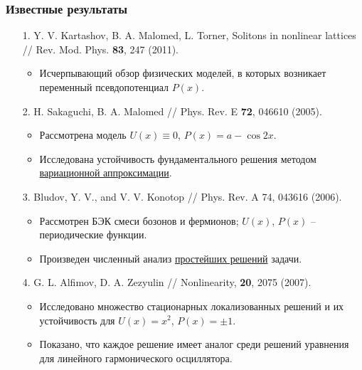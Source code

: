 \documentclass [10pt] {beamer}
\begin{document}
\begin{frame}
	\frametitle{Известные результаты}
	
	\begin{small}
	\begin{enumerate}
		\setlength\itemsep{5pt}
		\item[1.] Y. V. Kartashov, B. A. Malomed, L. Torner, Solitons in nonlinear lattices // Rev. Mod. Phys. {\bf 83}, 247 (2011).
			\begin{itemize}
				\item Исчерпывающий обзор физических моделей, в которых возникает переменный псевдопотенциал $P(x)$.
			\end{itemize}
		\item[2.] H. Sakaguchi, B. A. Malomed // Phys. Rev. E {\bf 72}, 046610 (2005).
			\begin{itemize}
				\item Рассмотрена модель $U(x) \equiv 0$, $P(x) = a - \cos 2x$.
				\item Исследована устойчивость фундаментального решения методом \underline{вариационной аппроксимации}.
			\end{itemize}
		\item[3.] Bludov, Y. V., and V. V. Konotop // Phys. Rev. A 74, 043616 (2006).
			\begin{itemize}
				\item Рассмотрен БЭК смеси бозонов и фермионов; $U(x)$, $P(x)$ -- периодические функции.
				\item Произведен численный анализ \underline{простейших решений} задачи.
			\end{itemize}
		\item[4.] G. L. Alfimov, D. A. Zezyulin // Nonlinearity, {\bf 20}, 2075 (2007).
			\begin{itemize}
				\item Исследовано множество стационарных локализованных решений и их устойчивость для $U(x) = x^2$, $P(x) = \pm 1$.
				\item Показано, что каждое решение имеет аналог среди решений уравнения для линейного гармонического осциллятора.
			\end{itemize}
	\end{enumerate}
	\end{small}
\end{frame}
\end{document}

